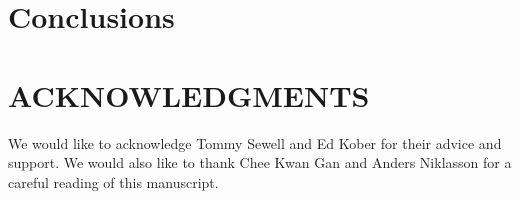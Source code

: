 \commentoutA{\documentclass[prb,aps,nobibnotes,twocolumn,doublespace,twocolumngrid,superbib,showpacs]{revtex4}}
\begin{document}
\section{Conclusions}
\section*{ACKNOWLEDGMENTS}

We would like to acknowledge Tommy Sewell and Ed Kober for their advice
and support. We would also like to thank Chee Kwan Gan and Anders Niklasson 
for a careful reading of this manuscript.\cite{ANiklasson02A,ANiklasson03}

 
 
\end{document}
